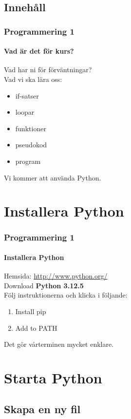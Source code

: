 \documentclass[aspectratio=169]{beamer}
\begin{document}
\subsection{Innehåll}

\begin{frame}
\frametitle{Programmering 1}
\framesubtitle{Vad är det för kurs?}

Vad har ni för förväntningar?\\ \pause
Vad vi ska lära oss:\\
\begin{itemize}
\item if-satser
\item loopar
\item funktioner
\item pseudokod
\item program
\end{itemize}

Vi kommer att använda Python.

\end{frame}

\section{Installera Python}

\begin{frame}
	\frametitle{Programmering 1}
	\framesubtitle{Installera Python}
	
	Hemsida: \url{http://www.python.org/}\\
	Download \textbf{Python 3.12.5}\\
	Följ instruktionerna och klicka i följande:\\
	\begin{enumerate}
		\item Install pip
		\item Add to PATH
	\end{enumerate}
	
	Det gör vårterminen mycket enklare.

\end{frame}

\section{Starta Python}

\subsection{Skapa en ny fil}
\end{document}
